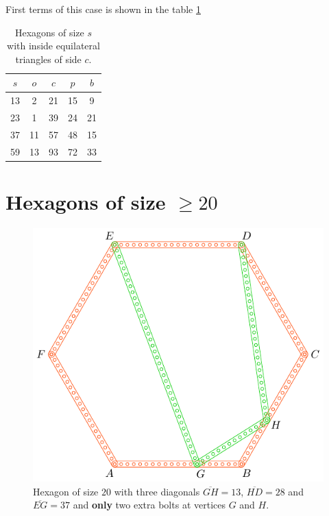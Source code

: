 \documentclass[11pt]{article}
\begin{document}
First terms of this case is shown in the table \ref{tbl:eqtriangles}
\begin{table}[H]
\begin{center}
\begin{tabular}{| c c | c c c |} 
 \hline
 $s$ & $o$ & $c$ & $p$ & $b$ \\ [0.5ex] 
 \hline\hline
  13 &  2 &  21 &  15 &  9 \\ \hline
  23 &  1 &  39 &  24 & 21 \\ \hline
  37 & 11 &  57 &  48 & 15 \\ \hline
  59 & 13 &  93 &  72 & 33 \\ \hline
\end{tabular}
\caption{Hexagons of size $s$ with inside equilateral triangles of side $c$.}
\label{tbl:eqtriangles}
\end{center}
\end{table}

\section{Hexagons of size $\ge 20$}

\begin{figure}[H]
\centering
\includegraphics[scale=1]{20/hexa-20a}
\caption{Hexagon of size $20$ with three diagonals $\overline{GH} = 13$, $\overline{HD} = 28$ and $\overline{EG} = 37$ and \textbf{only} two extra bolts at vertices $G$ and $H$.}
\label{fig:20a}
\end{figure}
\end{document}
